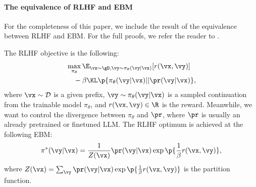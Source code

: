 \paragraph{The equivalence of RLHF and EBM} For the completeness of this paper, we include the result of the equivalence between RLHF and EBM. For the full proofs, we refer the reader to \cite{rafailov2023direct,korbak2022rl}.

The RLHF objective is the following:
\begin{align}\label{eq:rlhf_objective}
\begin{split}
		& \max_{\pi_\theta} \E_{\vx\sim\gD, \vy\sim\pi_\theta(\vy|\vx)}[r(\vx, \vy)] \\
		& \quad-\beta \KL\p{\pi_\theta(\vy|\vx)||\pr(\vy|\vx)},
\end{split}
\end{align}
where $\vx\sim\mathcal{D}$ is a given prefix, $\vy\sim\pi_\theta(\vy|\vx)$ is a sampled continuation from the trainable model $\pi_\theta$, and $r(\vx, \vy)\in \R$ is the reward. Meanwhile, we want to control the divergence between $\pi_\theta$ and $\pr$, where $\pr$ is usually an already pretrained or finetuned LLM.
The RLHF optimum is achieved at the following EBM:
\begin{align}\label{eq:rlhf_ebm}
	\pi^*(\vy|\vx) = \frac{1}{Z(\vx)}\pr(\vy|\vx)\exp\p{\frac{1}{\beta}r(\vx,\vy)},
\end{align}
where $Z(\vx)=\sum_{\vy}\pr(\vy|\vx)\exp\p{\frac{1}{\beta}r(\vx,\vy)}$ is the partition function.


